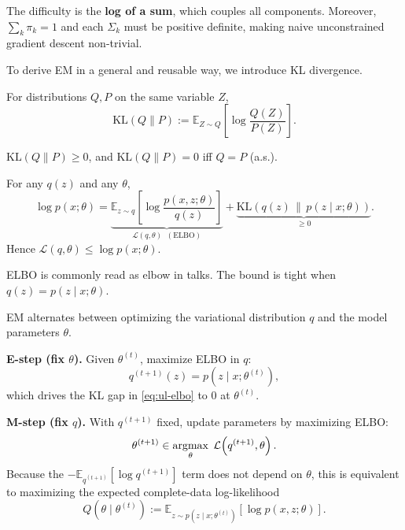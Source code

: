 \documentclass[../main]{subfiles}
\begin{document}
\begin{remark}
    The difficulty is the \textbf{log of a sum}, which couples all components.
    Moreover, $\sum_k\pi_k=1$ and each $\Sigma_k$ must be positive definite,
    making naive unconstrained gradient descent non-trivial.
\end{remark}

To derive EM in a general and reusable way, we introduce KL divergence.
\begin{definition}
    For distributions $Q,P$ on the same variable $Z$,
    \begin{equation}
        \mathrm{KL}(Q\|P)
        := \mathbb E_{Z\sim Q}\!\left[\log\frac{Q(Z)}{P(Z)}\right].
    \end{equation}
\end{definition}

\begin{proposition}\label{prop:ul-kl}
    $\mathrm{KL}(Q\|P)\ge 0$, and $\mathrm{KL}(Q\|P)=0$ iff $Q=P$ (a.s.).
\end{proposition}

\begin{theorem}\label{thm:ul-elbo}
    For any $q(z)$ and any $\theta$,
    \begin{equation}\label{eq:ul-elbo}
        \log p(x;\theta)
        =
        \underbrace{
        \mathbb E_{z\sim q}\!\left[\log \frac{p(x,z;\theta)}{q(z)}\right]
        }_{\mathcal L(q,\theta)\;\;(\text{ELBO})}
        +
        \underbrace{
        \mathrm{KL}\!\left(q(z)\,\middle\|\,p(z\mid x;\theta)\right)
        }_{\ge 0}.
    \end{equation}
    Hence $\mathcal L(q,\theta)\le \log p(x;\theta)$.
\end{theorem}

\begin{remark}
    ELBO is commonly read as elbow in talks.
    The bound is tight when $q(z)=p(z\mid x;\theta)$.
\end{remark}

EM alternates between optimizing the variational distribution $q$ and the model
parameters $\theta$.

\textbf{E-step (fix $\theta$).}
Given $\theta^{(t)}$, maximize ELBO in $q$:
\begin{equation}
    q^{(t+1)}(z)=p(z\mid x;\theta^{(t)}),
\end{equation}
which drives the KL gap in \eqref{eq:ul-elbo} to $0$ at $\theta^{(t)}$.

\textbf{M-step (fix $q$).}
With $q^{(t+1)}$ fixed, update parameters by maximizing ELBO:
\begin{equation}
    \theta^{(t+1)}\in\mathop{\mathrm{argmax}}_{\theta}\; \mathcal L\!\left(q^{(t+1)},\theta\right).
\end{equation}
Because the $-\mathbb E_{q^{(t+1)}}[\log q^{(t+1)}]$ term does not depend on
$\theta$, this is equivalent to maximizing the expected complete-data
log-likelihood
\begin{equation}
    Q(\theta\mid \theta^{(t)})
    :=
    \mathbb E_{z\sim p(z\mid x;\theta^{(t)})}\!\left[\log p(x,z;\theta)\right].
\end{equation}
\end{document}
